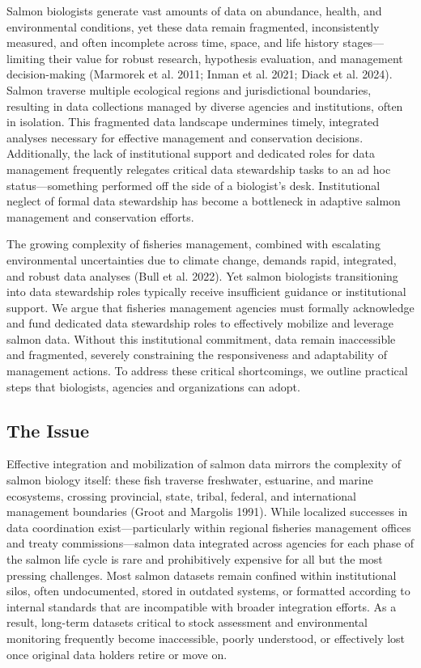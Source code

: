 \documentclass[
  letterpaper,
  DIV=11,
  numbers=noendperiod]{scrartcl}
\begin{document}
Salmon biologists generate vast amounts of data on abundance, health,
and environmental conditions, yet these data remain fragmented,
inconsistently measured, and often incomplete across time, space, and
life history stages---limiting their value for robust research,
hypothesis evaluation, and management decision-making (Marmorek et al.
2011; Inman et al. 2021; Diack et al. 2024). Salmon traverse multiple
ecological regions and jurisdictional boundaries, resulting in data
collections managed by diverse agencies and institutions, often in
isolation. This fragmented data landscape undermines timely, integrated
analyses necessary for effective management and conservation decisions.
Additionally, the lack of institutional support and dedicated roles for
data management frequently relegates critical data stewardship tasks to
an ad hoc status---something performed off the side of a biologist's
desk. Institutional neglect of formal data stewardship has become a
bottleneck in adaptive salmon management and conservation efforts.

The growing complexity of fisheries management, combined with escalating
environmental uncertainties due to climate change, demands rapid,
integrated, and robust data analyses (Bull et al. 2022). Yet salmon
biologists transitioning into data stewardship roles typically receive
insufficient guidance or institutional support. We argue that fisheries
management agencies must formally acknowledge and fund dedicated data
stewardship roles to effectively mobilize and leverage salmon data.
Without this institutional commitment, data remain inaccessible and
fragmented, severely constraining the responsiveness and adaptability of
management actions. To address these critical shortcomings, we outline
practical steps that biologists, agencies and organizations can adopt.

\subsection{The Issue}\label{the-issue}

Effective integration and mobilization of salmon data mirrors the
complexity of salmon biology itself: these fish traverse freshwater,
estuarine, and marine ecosystems, crossing provincial, state, tribal,
federal, and international management boundaries (Groot and Margolis
1991). While localized successes in data coordination
exist---particularly within regional fisheries management offices and
treaty commissions---salmon data integrated across agencies for each
phase of the salmon life cycle is rare and prohibitively expensive for
all but the most pressing challenges. Most salmon datasets remain
confined within institutional silos, often undocumented, stored in
outdated systems, or formatted according to internal standards that are
incompatible with broader integration efforts. As a result, long-term
datasets critical to stock assessment and environmental monitoring
frequently become inaccessible, poorly understood, or effectively lost
once original data holders retire or move on.
\end{document}
